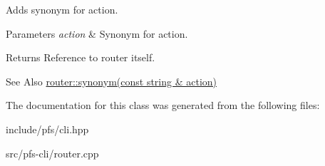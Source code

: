 Adds synonym for action. 


\begin{DoxyParams}{Parameters}
{\em action} & Synonym for action. \\
\hline
\end{DoxyParams}
\begin{DoxyReturn}{Returns}
Reference to router itself.
\end{DoxyReturn}
\begin{DoxySeeAlso}{See Also}
\hyperlink{classpfs_1_1cli_1_1router_aaadb7eb9699252dce1931a47d2b7a9c0}{router\-::synonym(const string \& action)} 
\end{DoxySeeAlso}


The documentation for this class was generated from the following files\-:\begin{DoxyCompactItemize}
\item 
include/pfs/cli.\-hpp\item 
src/pfs-\/cli/router.\-cpp\end{DoxyCompactItemize}
